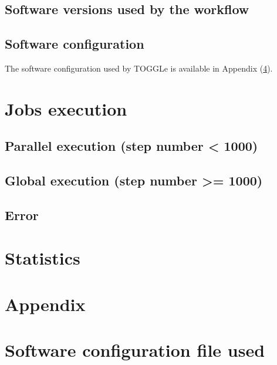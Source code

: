 \documentclass[a4paper]{article}
\begin{document}
\subsection{Software versions used by the workflow}

\begin{minipage}{\linewidth}

\end{minipage}

\subsection{Software configuration}
The software configuration used by TOGGLe is available in Appendix (\ref{appendix:config}).





\section{Jobs execution}

\subsection{Parallel execution (step number < 1000)}



\subsection{Global execution (step number >= 1000)}


\subsection{Error}

\newpage
\section{Statistics}



\clearpage




\clearpage
\section{Appendix}\appendix

\section{ Software configuration file used}
\label{appendix:config}

\end{document}
